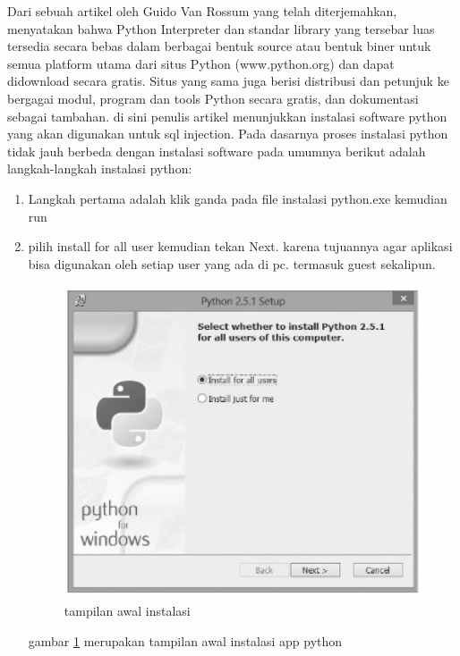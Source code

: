 	Dari sebuah artikel oleh Guido Van Rossum yang telah diterjemahkan, menyatakan bahwa Python Interpreter dan standar library 
	yang tersebar luas tersedia secara bebas dalam berbagai bentuk source atau bentuk biner untuk semua platform utama dari situs 
	Python (www.python.org) dan dapat didownload secara gratis. Situs yang sama juga berisi distribusi dan petunjuk ke bergagai 
	modul, program dan tools Python secara gratis, dan dokumentasi sebagai tambahan. \cite {van1995python}
	di sini penulis artikel menunjukkan instalasi software python yang akan
	digunakan untuk sql injection. Pada dasarnya proses instalasi python tidak jauh berbeda dengan instalasi software pada umumnya
	berikut adalah langkah-langkah instalasi python:

	\begin {enumerate}
	\item
	Langkah pertama adalah klik ganda pada file instalasi python.exe
	kemudian run

	\item
	pilih install for all user kemudian tekan Next. karena tujuannya
	agar aplikasi bisa digunakan oleh setiap user yang ada di pc.
	termasuk guest sekalipun.
			
	\begin{figure}[ht]
	\centerline{\includegraphics[width=1\textwidth]{figures/awal.PNG}}
	\caption{tampilan awal instalasi}
	\label{awal}
	\end{figure}
	
	gambar \ref {awal} merupakan tampilan awal instalasi app python
	

\end{enumerate}
